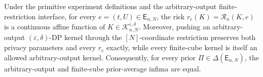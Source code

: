 \begin{proposition}
\label{prop:step-005-risk-restriction}

Under the primitive experiment definitions and the arbitrary-output finite-restriction interface, for every
\(e=(t,U)\in\mathsf E_{n,N}\), the risk
\(r_e(K)=\mathcal R_n(K,e)\) is a continuous affine function of
\(K\in\mathcal K_{n,N}^{\varepsilon,\delta}\). Moreover, pushing an arbitrary-output \((\varepsilon,\delta)\)-DP kernel through the \([N]\)-coordinate restriction preserves both privacy parameters and every \(r_e\) exactly, while every finite-cube kernel is itself an allowed arbitrary-output kernel. Consequently, for every prior
\(\Pi\in\Delta(\mathsf E_{n,N})\), the arbitrary-output and finite-cube prior-average infima are equal.

\end{proposition}

